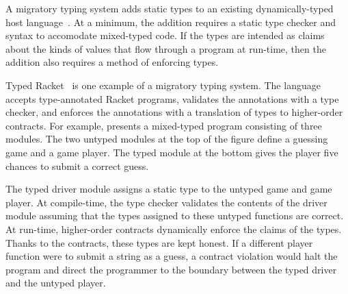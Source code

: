 A migratory typing system adds static types to an existing
dynamically-typed host language~\cite{tfffgksst-snapl-2017}.
At a minimum, the addition requires a static type checker and
syntax to accomodate mixed-typed code.
If the types are intended as claims about the kinds of values that
flow through a program at run-time, then the addition also requires a method
of enforcing types.

Typed Racket~\cite{tf-popl-2008} is one example of a migratory typing system.
The language accepts type-annotated Racket programs,
validates the annotations with a type checker, and enforces the annotations
with a translation of types to higher-order contracts.
For example,  presents a mixed-typed
program consisting of three modules.
The two untyped modules at the top of the figure define a guessing game
and a game player.
The typed module at the bottom gives the player five chances to submit a
correct guess.

The typed driver module assigns a static type to the untyped game and
 game player.
At compile-time, the type checker validates the contents of the driver module
 assuming that the types assigned to these untyped functions are correct.
At run-time, higher-order contracts dynamically enforce the claims of the types.
Thanks to the contracts, these types are kept honest.
If a different player function were to submit a string as a guess, a contract
 violation would halt the program and direct the programmer to the boundary
 between the typed driver and the untyped player.

